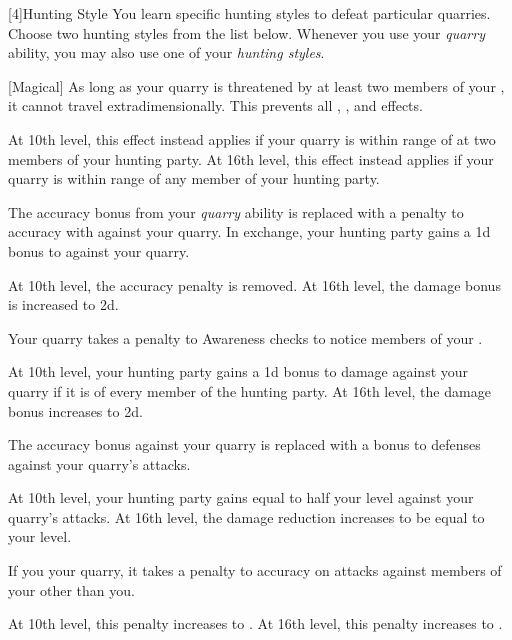         [4]{Hunting Style}
        You learn specific hunting styles to defeat particular quarries.
        Choose two hunting styles from the list below.
        Whenever you use your \textit{quarry} ability, you may also use one of your \textit{hunting styles}.
        {
            [Magical]
            As long as your quarry is threatened by at least two members of your , it cannot travel extradimensionally.
            This prevents all , , and  effects.
            \par At 10th level, this effect instead applies if your quarry is within \rngmed range of at two members of your hunting party.
            At 16th level, this effect instead applies if your quarry is within \rnglong range of any member of your hunting party.

            The accuracy bonus from your \textit{quarry} ability is replaced with a  penalty to accuracy with  against your quarry.
            In exchange, your hunting party gains a \plus1d bonus to  against your quarry.
            \par At 10th level, the accuracy penalty is removed.
            At 16th level, the damage bonus is increased to \plus2d.

            Your quarry takes a  penalty to Awareness checks to notice members of your .
            \par At 10th level, your hunting party gains a \plus1d bonus to damage against your quarry if it is \unaware of every member of the hunting party.
            At 16th level, the damage bonus increases to \plus2d.

            The accuracy bonus against your quarry is replaced with a  bonus to defenses against your quarry's attacks.
            \par At 10th level, your hunting party gains  equal to half your level against your quarry's attacks.
            At 16th level, the damage reduction increases to be equal to your level.

            If you  your quarry, it takes a  penalty to accuracy on attacks against members of your  other than you.
            \par At 10th level, this penalty increases to .
            At 16th level, this penalty increases to .

}
